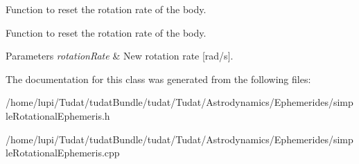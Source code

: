 Function to reset the rotation rate of the body. 

Function to reset the rotation rate of the body. 
\begin{DoxyParams}{Parameters}
{\em rotation\+Rate} & New rotation rate \mbox{[}rad/s\mbox{]}. \\
\hline
\end{DoxyParams}


The documentation for this class was generated from the following files\+:\begin{DoxyCompactItemize}
\item 
/home/lupi/\+Tudat/tudat\+Bundle/tudat/\+Tudat/\+Astrodynamics/\+Ephemerides/simple\+Rotational\+Ephemeris.\+h\item 
/home/lupi/\+Tudat/tudat\+Bundle/tudat/\+Tudat/\+Astrodynamics/\+Ephemerides/simple\+Rotational\+Ephemeris.\+cpp\end{DoxyCompactItemize}
